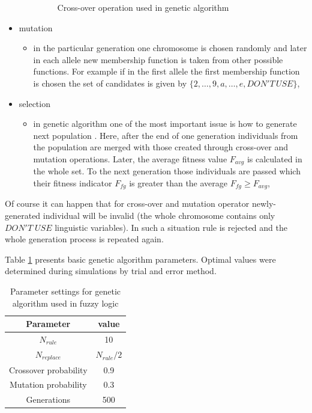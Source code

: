 \begin{itemize}
\begin{itemize}
\begin{figure}[H]
                    \caption{Cross-over operation used in genetic algorithm}
                    \label{fig:cross_over}
                \end{figure}
        \end{itemize}
    \item mutation
        \begin{itemize}
            \item in the particular generation one chromosome is chosen
                randomly and later in each allele new membership function is
                taken from other possible functions. For example if in the first
                allele the first membership function is chosen the set of
                candidates is given by $\{2, \ldots, 9, a, \ldots, e, DON'T\,
                USE\}$,
        \end{itemize}
    \item selection
        \begin{itemize}
            \item in genetic algorithm one of the most important issue is how
                to generate next population \cite{bib22}. Here, after the end of one
                generation individuals from the population are merged with
                those created through cross-over and mutation operations.
                Later, the average fitness value $F_{avg}$ is calculated in the whole
                set. To the next generation those individuals are passed which
                their fitness indicator $F_{fg}$ is greater than the average
                $F_{fg} \ge F_{avg}$,
        \end{itemize}
\end{itemize}
Of course it can happen that for cross-over and mutation operator
newly-generated individual will be invalid (the whole chromosome contains only
$DON'T\; USE$ linguistic variables). In such a situation rule is rejected and
the whole generation process is repeated again.

Table \ref{tab:fuzzy_genetic_parameters} presents basic genetic algorithm parameters.
Optimal values were determined during simulations by trial and error method.
\begin{table}[H]
    \caption{Parameter settings for genetic algorithm used in fuzzy logic}
    \centering
    \begin{tabular}{|c|c|}
        \hline
        Parameter & value \\ \hline \hline
        $N_{rule}$ & 10 \\ \hline
        $N_{replace}$ & $N_{rule}/2$ \\ \hline
        Crossover probability & 0.9 \\ \hline
        Mutation probability & 0.3 \\ \hline
        Generations & 500 \\ \hline
    \end{tabular}
    \label{tab:fuzzy_genetic_parameters}
\end{table}

